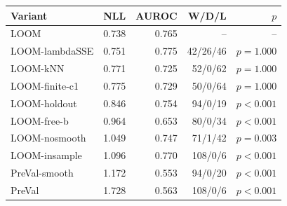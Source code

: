 \begin{tabular}{lrrrr}
\toprule
Variant & NLL & AUROC & W/D/L & $p$ \\
\midrule
LOOM & 0.738 & 0.765 & -- & -- \\
LOOM-lambdaSSE & 0.751 & 0.775 & 42/26/46 & $p=1.000$ \\
LOOM-kNN & 0.771 & 0.725 & 52/0/62 & $p=1.000$ \\
LOOM-finite-c1 & 0.775 & 0.729 & 50/0/64 & $p=1.000$ \\
LOOM-holdout & 0.846 & 0.754 & 94/0/19 & $p<0.001$ \\
LOOM-free-b & 0.964 & 0.653 & 80/0/34 & $p<0.001$ \\
LOOM-nosmooth & 1.049 & 0.747 & 71/1/42 & $p=0.003$ \\
LOOM-insample & 1.096 & 0.770 & 108/0/6 & $p<0.001$ \\
PreVal-smooth & 1.172 & 0.553 & 94/0/20 & $p<0.001$ \\
PreVal & 1.728 & 0.563 & 108/0/6 & $p<0.001$ \\
\bottomrule
\end{tabular}
